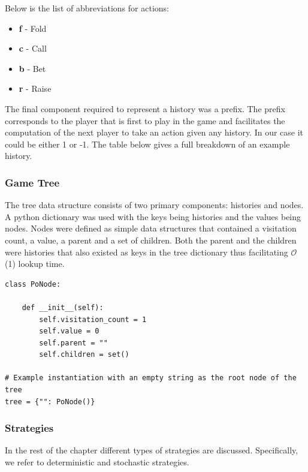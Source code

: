 Below is the list of abbreviations for actions:
\begin{itemize}
    \item \textbf{f} - Fold
    \item \textbf{c} - Call
    \item \textbf{b} - Bet
    \item \textbf{r} - Raise
\end{itemize}

The final component required to represent a history was a prefix.
The prefix corresponds to the player that is first to play in the game and facilitates the computation of
the next player to take an action given any history.
In our case it could be either 1 or -1.
The table below gives a full breakdown of an example history.


\subsubsection{Game Tree}
The tree data structure consists of two primary components: histories and nodes.
A python dictionary was used with the keys being histories and the values being nodes.
Nodes were defined as simple data structures that contained a visitation count, a value,
a parent and a set of children.
Both the parent and the children were histories that also existed as keys in the
tree dictionary thus facilitating $\mathcal{O}$(1) lookup time.

\begin{lstlisting}[style=Python]
class PoNode:

    def __init__(self):
        self.visitation_count = 1
        self.value = 0
        self.parent = ""
        self.children = set()

# Example instantiation with an empty string as the root node of the tree
tree = {"": PoNode()}
\end{lstlisting}

\subsubsection{Strategies}
In the rest of the chapter different types of strategies are discussed.
Specifically, we refer to deterministic and stochastic strategies.

